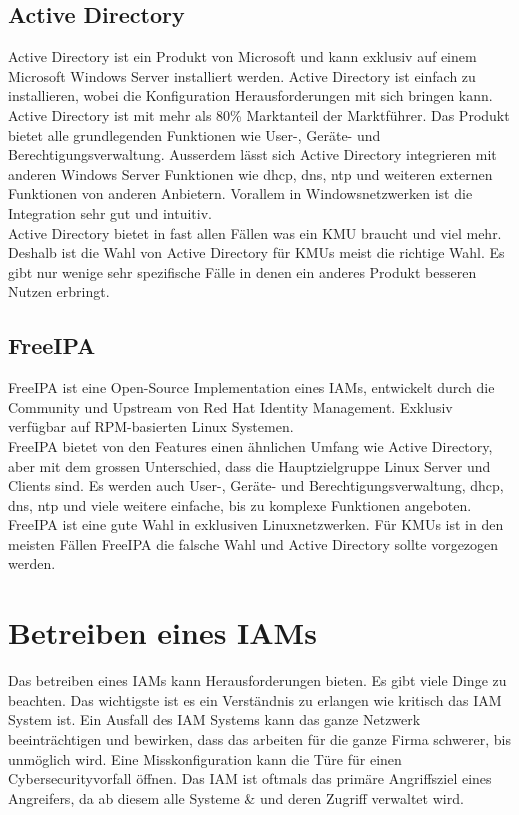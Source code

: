 \subsection{Active Directory}
Active Directory ist ein Produkt von Microsoft und kann exklusiv auf einem Microsoft Windows Server installiert werden. Active Directory ist einfach zu installieren, wobei die Konfiguration Herausforderungen mit sich bringen kann.\\

Active Directory ist mit mehr als 80\% Marktanteil der Marktführer. 
Das Produkt bietet alle grundlegenden Funktionen wie User-, Geräte- und Berechtigungsverwaltung.
Ausserdem lässt sich Active Directory integrieren mit anderen Windows Server Funktionen wie \acrshort{dhcp}, \acrshort{dns}, \acrshort{ntp} und weiteren externen Funktionen von anderen Anbietern. 
Vorallem in Windowsnetzwerken ist die Integration sehr gut und intuitiv.\\


Active Directory bietet in fast allen Fällen was ein KMU braucht und viel mehr. Deshalb ist die Wahl von Active Directory für KMUs meist die richtige Wahl. Es gibt nur wenige sehr spezifische Fälle in denen ein anderes Produkt besseren Nutzen erbringt. 


\subsection{FreeIPA}
FreeIPA ist eine Open-Source Implementation eines IAMs, entwickelt durch die Community und Upstream von Red Hat Identity Management. Exklusiv verfügbar auf RPM-basierten Linux Systemen.\\

FreeIPA bietet von den Features einen ähnlichen Umfang wie Active Directory, aber mit dem grossen Unterschied, dass die Hauptzielgruppe Linux Server und Clients sind. Es werden auch User-, Geräte- und Berechtigungsverwaltung, \acrshort{dhcp}, \acrshort{dns}, \acrshort{ntp} und viele weitere einfache, bis zu komplexe Funktionen angeboten.\\

FreeIPA ist eine gute Wahl in exklusiven Linuxnetzwerken. Für KMUs ist in den meisten Fällen FreeIPA die falsche Wahl und Active Directory sollte vorgezogen werden.


\section{Betreiben eines IAMs}
Das betreiben eines IAMs kann Herausforderungen bieten.
Es gibt viele Dinge zu beachten.
Das wichtigste ist es ein Verständnis zu erlangen wie kritisch das IAM System ist.
Ein Ausfall des IAM Systems kann das ganze Netzwerk beeinträchtigen und bewirken, dass das arbeiten für die ganze Firma schwerer, bis unmöglich wird.
Eine Misskonfiguration kann die Türe für einen Cybersecurityvorfall öffnen.
Das IAM ist oftmals das primäre Angriffsziel eines Angreifers, da ab diesem alle Systeme \& und deren Zugriff verwaltet wird.\\

